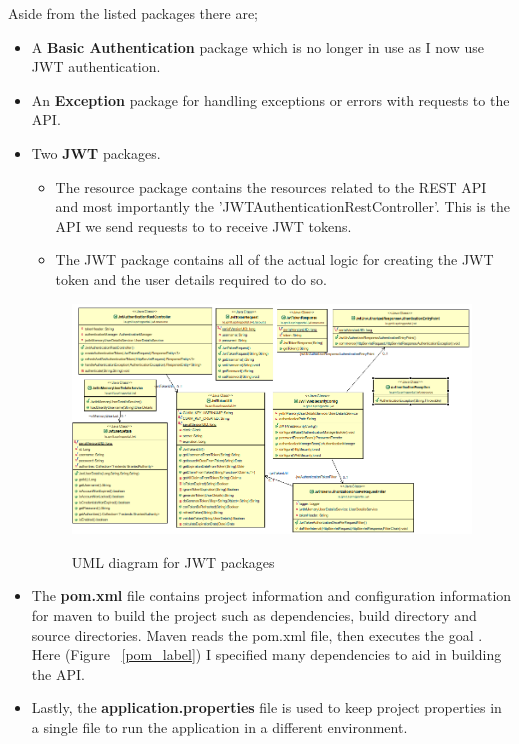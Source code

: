 Aside from the listed packages there are;
\begin{itemize}
    \item A \textbf{Basic Authentication} package which is no longer in use as I now use JWT authentication.
    \item An \textbf{Exception} package for handling exceptions or errors with requests to the API.
    \item Two \textbf{JWT} packages.
        \begin{itemize}
            \item The resource package contains the resources related to the REST API and most importantly the 'JWTAuthenticationRestController'. This is the API we send requests to to receive JWT tokens.
            \item The JWT package contains all of the actual logic for creating the JWT token and the user details required to do so.
        \end{itemize}
        \begin{figure}[ht]
        \centering
        \includegraphics[scale=0.4]{Images/JWT UML.png} 
        \label{jwtuml_label}
        \caption{UML diagram for JWT packages}
        \end{figure}
        \item The \textbf{pom.xml} file contains project information and configuration information for maven to build the project such as dependencies, build directory and source directories. Maven reads the pom.xml file, then executes the goal \cite{POM}. Here (Figure ~\ref{pom_label}) I specified many dependencies to aid in building the API.
        \item Lastly, the \textbf{application.properties} file is used to keep project properties in a single file to run the application in a different environment.
\end{itemize}
